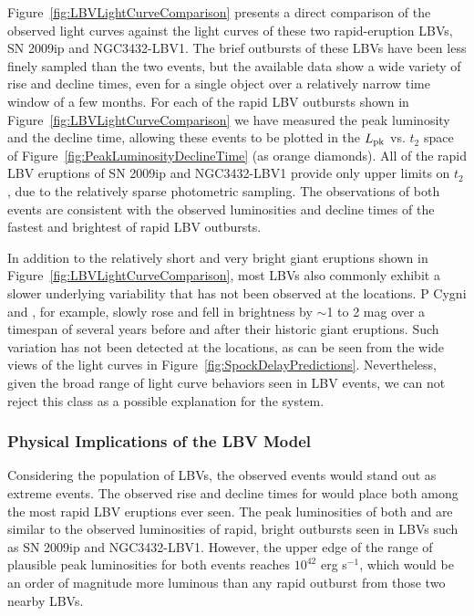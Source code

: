 Figure~\ref{fig:LBVLightCurveComparison} presents a direct comparison
of the observed \spock light curves against the light curves of these
two rapid-eruption LBVs, SN 2009ip and NGC3432-LBV1. The brief
outbursts of these LBVs have been less finely sampled than the two
\spock events, but the available data show a wide variety of rise and
decline times, even for a single object over a relatively narrow time
window of a few months. For each of the rapid LBV outbursts shown in
Figure~\ref{fig:LBVLightCurveComparison} we have measured the peak
luminosity and the decline time, allowing these events to be plotted
in the $L_{\rm pk}$ vs. $t_2$ space of
Figure~\ref{fig:PeakLuminosityDeclineTime} (as orange diamonds).  All
of the rapid LBV eruptions of SN 2009ip and NGC3432-LBV1 provide only
upper limits on $t_2$, due to the relatively sparse photometric
sampling.  The observations of both \spock events are consistent with
the observed luminosities and decline times of the fastest and
brightest of rapid LBV outbursts. 

In addition to the relatively short and very bright giant eruptions
shown in Figure~\ref{fig:LBVLightCurveComparison}, most LBVs also
commonly exhibit a slower underlying variability that has not been
observed at the \spock locations. P Cygni and \etaCar, for example,
slowly rose and fell in brightness by $\sim$1 to 2 mag over a timespan
of several years before and after their historic giant eruptions.
Such variation has not been detected at the \spock locations, as can
be seen from the wide views of the \spock light curves in
Figure~\ref{fig:SpockDelayPredictions}. Nevertheless, given the broad
range of light curve behaviors seen in LBV events, we can not reject
this class as a possible explanation for the \spock system.



\subsubsection{Physical Implications of the LBV Model}

Considering the population of LBVs, the observed \spock events would
stand out as extreme events.  The observed rise and decline times for
\spock would place both among the most rapid LBV eruptions ever
seen.  The peak luminosities of both \spockone and \spocktwo are
similar to the observed luminosities of rapid, bright outbursts seen
in LBVs such as SN 2009ip and NGC3432-LBV1. However, the upper edge of
the range of plausible peak luminosities for both \spock events
reaches $10^{42}$ erg s$^{-1}$, which would be an order of magnitude
more luminous than any rapid outburst from those two nearby LBVs.

